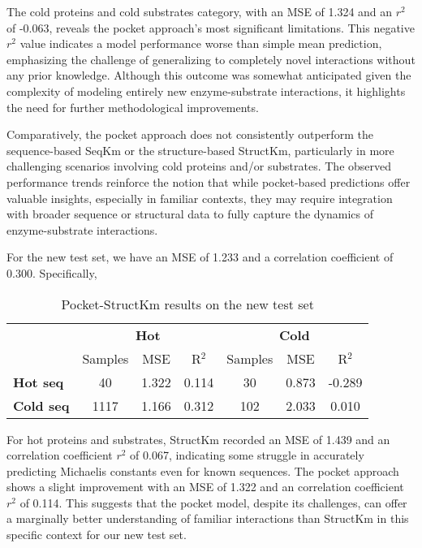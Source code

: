  The cold proteins and cold substrates category, with an MSE of 1.324 and an $r^2$ of -0.063, reveals the pocket approach's most significant limitations. This negative $r^2$ value indicates a model performance worse than simple mean prediction, emphasizing the challenge of generalizing to completely novel interactions without any prior knowledge. Although this outcome was somewhat anticipated given the complexity of modeling entirely new enzyme-substrate interactions, it highlights the need for further methodological improvements.
 
 Comparatively, the pocket approach does not consistently outperform the sequence-based SeqKm or the structure-based StructKm, particularly in more challenging scenarios involving cold proteins and/or substrates. The observed performance trends reinforce the notion that while pocket-based predictions offer valuable insights, especially in familiar contexts, they may require integration with broader sequence or structural data to fully capture the dynamics of enzyme-substrate interactions.

For the new test set, we have an MSE of 1.233 and a correlation coefficient of 0.300. Specifically,

\begin{table}[ht]
  \centering
  \begin{tabular}{lcccccc}
  \hline
   & \multicolumn{3}{c}{\textbf{Hot}} & \multicolumn{3}{c}{\textbf{Cold}} \\
   & Samples & MSE & R\(^2\) & Samples & MSE & R\(^2\) \\ \hline
  \textbf{Hot seq}  & 40 & 1.322 & 0.114 & 30 & 0.873 & -0.289 \\
  \textbf{Cold seq}& 1117 & 1.166 & 0.312 & 102 & 2.033 & 0.010 \\ \hline
  \end{tabular}
  \caption{Pocket-StructKm results on the new test set}
  \label{tab:results_pocket_new_test}
 \end{table}

For hot proteins and substrates, StructKm recorded an MSE of 1.439 and an correlation coefficient $r^2$ of 0.067, indicating some struggle in accurately predicting Michaelis constants even for known sequences. The pocket approach shows a slight improvement with an MSE of 1.322 and an correlation coefficient $r^2$ of 0.114. This suggests that the pocket model, despite its challenges, can offer a marginally better understanding of familiar interactions than StructKm in this specific context for our new test set.

